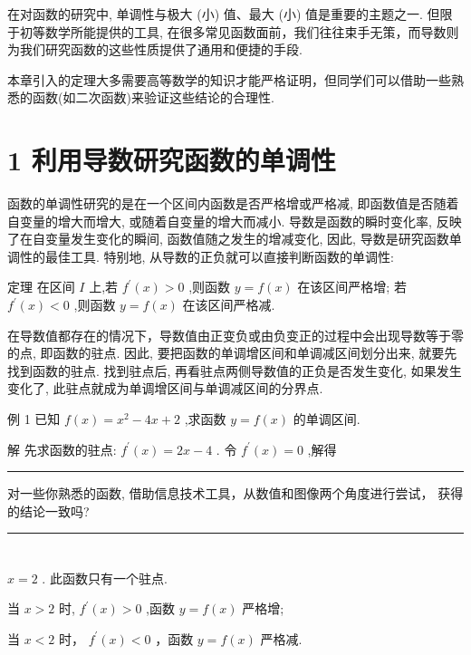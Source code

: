 \documentclass[10pt]{article}
\newcommand{\HRule}{\begin{center}\rule{0.9\linewidth}{0.2mm}\end{center}}
\begin{document}
在对函数的研究中, 单调性与极大 (小) 值、最大 (小) 值是重要的主题之一. 但限于初等数学所能提供的工具, 在很多常见函数面前，我们往往束手无策，而导数则为我们研究函数的这些性质提供了通用和便捷的手段.

本章引入的定理大多需要高等数学的知识才能严格证明，但同学们可以借助一些熟悉的函数(如二次函数)来验证这些结论的合理性.

\section*{1 利用导数研究函数的单调性}

函数的单调性研究的是在一个区间内函数是否严格增或严格减, 即函数值是否随着自变量的增大而增大, 或随着自变量的增大而减小. 导数是函数的瞬时变化率, 反映了在自变量发生变化的瞬间, 函数值随之发生的增减变化, 因此, 导数是研究函数单调性的最佳工具. 特别地, 从导数的正负就可以直接判断函数的单调性:

定理 在区间 \(I\) 上,若 \({f}^{\prime }\left( x\right)  > 0\) ,则函数 \(y = f\left( x\right)\) 在该区间严格增; 若 \({f}^{\prime }\left( x\right)  < 0\) ,则函数 \(y = f\left( x\right)\) 在该区间严格减.

在导数值都存在的情况下，导数值由正变负或由负变正的过程中会出现导数等于零的点, 即函数的驻点. 因此, 要把函数的单调增区间和单调减区间划分出来, 就要先找到函数的驻点. 找到驻点后, 再看驻点两侧导数值的正负是否发生变化, 如果发生变化了, 此驻点就成为单调增区间与单调减区间的分界点.

例 1 已知 \(f\left( x\right)  = {x}^{2} - {4x} + 2\) ,求函数 \(y = f\left( x\right)\) 的单调区间.

解 先求函数的驻点: \({f}^{\prime }\left( x\right)  = {2x} - 4\) . 令 \({f}^{\prime }\left( x\right)  = 0\) ,解得



\HRule

对一些你熟悉的函数, 借助信息技术工具，从数值和图像两个角度进行尝试， 获得的结论一致吗?

\HRule

\section*{}

\(x = 2\) . 此函数只有一个驻点.

当 \(x > 2\) 时, \({f}^{\prime }\left( x\right)  > 0\) ,函数 \(y = f\left( x\right)\) 严格增;

当 \(x < 2\) 时， \({f}^{\prime }\left( x\right)  < 0\) ，函数 \(y = f\left( x\right)\) 严格减.
\end{document}
